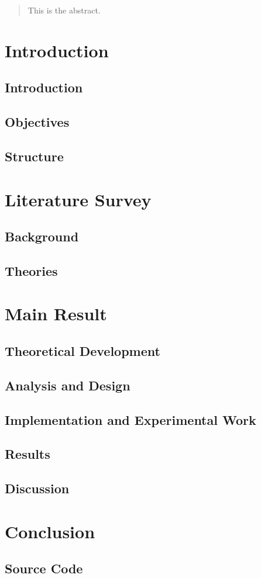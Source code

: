 \documentclass[11pt,a4paper]{report}
\begin{document}
	
	
	\begin{abstract}
		This is the abstract.
	\end{abstract}
	
	\tableofcontents

	\printnomenclature
	\listoffigures
	\listoftables
	
	\chapter{Introduction}
		\section{Introduction}
		\section{Objectives}
		\section{Structure}
	
	\chapter{Literature Survey}
		\section{Background}
		\section{Theories}
	
	\chapter{Main Result}
		\section{Theoretical Development}
		\section{Analysis and Design}
		\section{Implementation and Experimental Work}
		\section{Results}
		\section{Discussion}
		
	\chapter{Conclusion}
	
	
	
	\nocite{*}
	
	\begin{appendices}
		\chapter{Source Code}
	\end{appendices}
\end{document}
